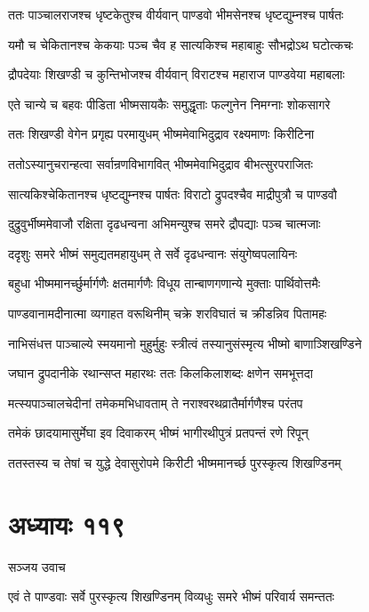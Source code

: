 \twolineshloka
{ततः पाञ्चालराजश्च धृष्टकेतुश्च वीर्यवान्}
{पाण्डवो भीमसेनश्च धृष्टद्युम्नश्च पार्षतः}


\twolineshloka
{यमौ च चेकितानश्च केकयाः पञ्च चैव ह}
{सात्यकिश्च महाबाहुः सौभद्रोऽथ घटोत्कचः}


\twolineshloka
{द्रौपदेयाः शिखण्डी च कुन्तिभोजश्च वीर्यवान्}
{विराटश्च महाराज पाण्डवेया महाबलाः}


\twolineshloka
{एते चान्ये च बहवः पीडिता भीष्मसायकैः}
{समुद्धृताः फल्गुनेन निमग्नाः शोकसागरे}


\twolineshloka
{ततः शिखण्डी वेगेन प्रगृह्य परमायुधम्}
{भीष्ममेवाभिदुद्राव रक्ष्यमाणः किरीटिना}


\twolineshloka
{ततोऽस्यानुचरान्हत्वा सर्वान्रणविभागवित्}
{भीष्ममेवाभिदुद्राव बीभत्सुरपराजितः}


\twolineshloka
{सात्यकिश्चेकितानश्च धृष्टद्युम्नश्च पार्षतः}
{विराटो द्रुपदश्चैव माद्रीपुत्रौ च पाण्डवौ}


\twolineshloka
{दुद्रुवुर्भीष्ममेवाजौ रक्षिता दृढधन्वना}
{अभिमन्युश्च समरे द्रौपद्याः पञ्च चात्मजाः}


\twolineshloka
{ददृशुः समरे भीष्मं समुद्यतमहायुधम्}
{ते सर्वे दृढधन्वानः संयुगेष्वपलायिनः}


\twolineshloka
{बहुधा भीष्ममानर्च्छुर्मार्गणैः क्षतमार्गणैः}
{विधूय तान्बाणगणान्ये मुक्ताः पार्थिवोत्तमैः}


\twolineshloka
{पाण्डवानामदीनात्मा व्यगाहत वरूथिनीम्}
{चक्रे शरविघातं च क्रीडन्निव पितामहः}


\twolineshloka
{नाभिसंधत्त पाञ्चाल्ये स्मयमानो मुहुर्मुहुः}
{स्त्रीत्वं तस्यानुसंस्मृत्य भीष्मो बाणाञ्शिखण्डिने}


\twolineshloka
{जघान द्रुपदानीके रथान्सप्त महारथः}
{ततः किलकिलाशब्दः क्षणेन समभूत्तदा}


\twolineshloka
{मत्स्यपाञ्चालचेदीनां तमेकमभिधावताम्}
{ते नराश्वरथव्रातैर्मार्गणैश्च परंतप}


\twolineshloka
{तमेकं छादयामासुर्मेघा इव दिवाकरम्}
{भीष्मं भागीरथीपुत्रं प्रतपन्तं रणे रिपून्}


\twolineshloka
{ततस्तस्य च तेषां च युद्धे देवासुरोपमे}
{किरीटी भीष्ममानर्च्छ पुरस्कृत्य शिखण्डिनम्}


\chapter{अध्यायः ११९}
\twolineshloka
{सञ्जय उवाच}
{}


\twolineshloka
{एवं ते पाण्डवाः सर्वे पुरस्कृत्य शिखण्डिनम्}
{विव्यधुः समरे भीष्मं परिवार्य समन्ततः}


